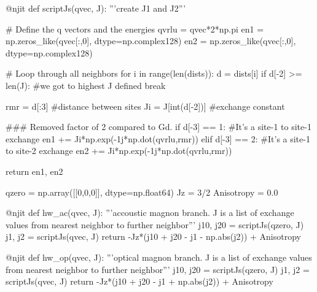 \documentclass[a4paper,12pt]{article}
\begin{document}
            \begin{python}
                @njit
                def scriptJs(qvec, J):
                    '''create J1 and J2'''
                    
                    # Define the q vectors and the energies
                    qvrlu = qvec*2*np.pi
                    en1 = np.zeros_like(qvec[:,0], dtype=np.complex128)
                    en2 = np.zeros_like(qvec[:,0], dtype=np.complex128)
                    
                    # Loop through all neighbors
                    for i in range(len(dists)):
                        d = dists[i]
                        if d[-2] >= len(J):  #we got to highest J defined
                            break
                        
                        rmr = d[:3] #distance between sites
                        Ji = J[int(d[-2])]  #exchange constant
                        
                        ### Removed factor of 2 compared to Gd.
                        if d[-3] == 1: #It's a site-1 to site-1 exchange
                            en1 += Ji*np.exp(-1j*np.dot(qvrlu,rmr))
                        elif d[-3] == 2: #It's a site-1 to site-2 exchange
                            en2 += Ji*np.exp(-1j*np.dot(qvrlu,rmr))
                        
                    return en1, en2

                qzero = np.array([[0,0,0]], dtype=np.float64)
                Jz = 3/2
                Anisotropy = 0.0

                @njit
                def hw_ac(qvec, J):
                    '''accoustic magnon branch. J is a list of exchange values 
                    from nearest neighbor to further neighbor'''
                    j10, j20 = scriptJs(qzero, J)
                    j1, j2 = scriptJs(qvec, J)
                    return -Jz*(j10 + j20 - j1 - np.abs(j2)) + Anisotropy
                    
                @njit
                def hw_op(qvec, J):
                    '''optical magnon branch. J is a list of exchange values 
                    from nearest neighbor to further neighbor'''
                    j10, j20 = scriptJs(qzero, J)
                    j1, j2 = scriptJs(qvec, J)
                    return -Jz*(j10 + j20 - j1 + np.abs(j2)) + Anisotropy
            \end{python}

    

    

    \newpage
     
     
\end{document}
